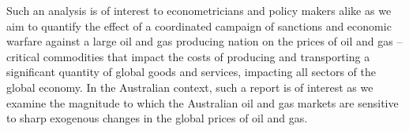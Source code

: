 Such an analysis is of interest to econometricians and policy makers alike as we aim to quantify the effect of a coordinated campaign of sanctions and economic warfare against a large oil and gas producing nation on the prices of oil and gas – critical commodities that impact the costs of producing and transporting a significant quantity of global goods and services, impacting all sectors of the global economy. In the Australian context, such a report is of interest as we examine the magnitude to which the Australian oil and gas markets are sensitive to sharp exogenous changes in the global prices of oil and gas.
